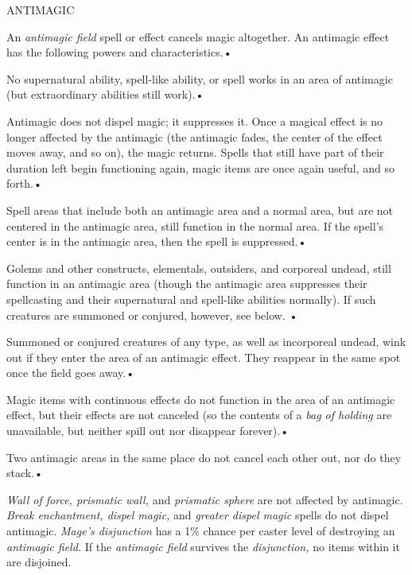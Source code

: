 \documentclass{article}
\begin{document}
\vspace{12pt}
ANTIMAGIC

An \textit{antimagic field }spell or effect cancels magic altogether. An antimagic 
effect has the following powers and characteristics.• 

\parindent=3pt
No supernatural ability, spell-like ability, or spell works in an area of antimagic 
(but extraordinary abilities still work).• 

Antimagic does not dispel magic; it suppresses it. Once a magical effect is no 
longer affected by the antimagic (the antimagic fades, the center of the effect 
moves away, and so on), the magic returns. Spells that still have part of their 
duration left begin functioning again, magic items are once again useful, and so 
forth.• 

\parindent=7pt
Spell areas that include both an antimagic area and a normal area, but are not 
centered in the antimagic area, still function in the normal area. If the spell's 
center is in the antimagic area, then the spell is suppressed.• 

\parindent=3pt
Golems and other constructs, elementals, outsiders, and corporeal undead, still 
function in an antimagic area (though the antimagic area suppresses their spellcasting 
and their supernatural and spell-like abilities normally). If such creatures are 
summoned or conjured, however, see below. • 

Summoned or conjured creatures of any type, as well as incorporeal undead, wink 
out if they enter the area of an antimagic effect. They reappear in the same spot 
once the field goes away.• 

\parindent=7pt
Magic items with continuous effects\textit{ }do not function in the area of an 
antimagic effect, but their effects are not canceled (so the contents of a \textit{bag 
of holding} are unavailable, but neither spill out nor disappear forever).• 

\parindent=3pt
Two antimagic areas in the same place do not cancel each other out, nor do they 
stack.• 

\parindent=0pt
\textit{Wall of force, prismatic wall, }and \textit{prismatic sphere }are not affected 
by antimagic. \textit{Break enchantment, dispel magic, }and \textit{greater dispel 
magic }spells do not dispel antimagic. \textit{Mage's disjunction }has a 1\% chance 
per caster level of destroying an \textit{antimagic field. }If the \textit{antimagic 
field }survives the \textit{disjunction, }no items within it are disjoined.
\end{document}
